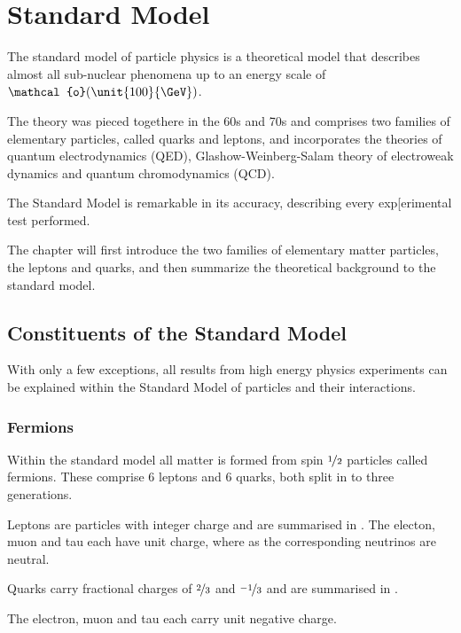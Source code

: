\chapter{Standard Model}

The standard model of particle physics is a theoretical model that describes
almost all sub-nuclear phenomena up to an energy scale of
$\mathcal{o}(\unit{100}{\GeV})$.

The theory was pieced togethere in the 60s and 70s and comprises two families of
elementary particles, called quarks and leptons, and incorporates the theories
of quantum electrodynamics (QED), Glashow-Weinberg-Salam theory of electroweak
dynamics and quantum chromodynamics (QCD).

The Standard Model is remarkable in its accuracy, describing every exp[erimental
test performed.

The chapter will first introduce the two families of elementary matter
particles, the leptons and quarks, and then summarize the theoretical background
to the standard model.



\section{Constituents of the Standard Model}
With only a few exceptions, all results from high energy physics experiments can
be explained within the Standard Model of particles and their interactions.

\subsection{Fermions}
Within the standard model all matter is formed from spin $\nicefrac{1}{2}$
particles called fermions.  These comprise 6 leptons and 6 quarks, both split in
to three generations.

Leptons are particles with integer charge and are summarised in \TableRef{}. The
electon, muon and tau each have unit charge, where as the corresponding
neutrinos are neutral. 

Quarks carry fractional charges of $\nicefrac{2}{3}$ and $\nicefrac{-1}{3}$ and
are summarised in \TableRef{}. 


The electron, muon and tau each carry unit negative charge. 

